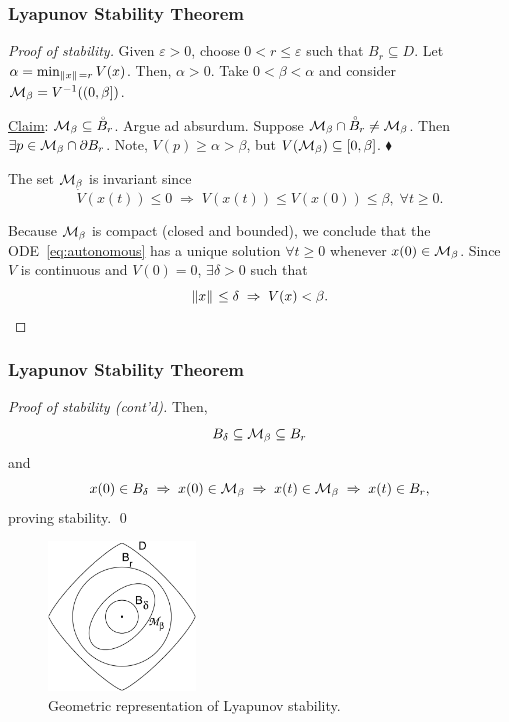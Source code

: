 \begin{frame}
    \frametitle{Lyapunov Stability Theorem}

    \begin{proof}[Proof of stability]
        Given $\varepsilon > 0$, choose $0 < r \leq \varepsilon$ such that $B_r
        \subseteq D$. Let $\alpha = \min_{\|{x}\|_{{}_{}}=r} V(x)$. Then, $\alpha >
        0$. Take $0 < \beta < \alpha$ and consider $\mathcal{M}_\beta = V^{-1}((0,
        \beta])$.

        \underline{Claim}: $\mathcal{M}_\beta \subseteq \accentset{\circ}{B}_r$.
        Argue ad absurdum. Suppose $\mathcal{M}_\beta \cap \accentset{\circ}{B}_r
        \neq \mathcal{M}_\beta$. Then $\exists p \in \mathcal{M}_\beta \cap \partial B_r$.
        Note, $V(p) \geq \alpha > \beta$, but $V(\mathcal{M}_\beta) \subseteq
        [0,\beta]$. \hfill $\blacklozenge$

        The set $\mathcal{M}_\beta$ is invariant since \[ \dot{V}(x(t)) \leq 0 \;
        \Rightarrow \; V(x(t)) \leq V(x(0)) \leq \beta, \; \forall t \geq 0. \]

        Because $\mathcal{M}_\beta$ is compact (closed and bounded), we conclude that
        the ODE~\eqref{eq:autonomous} has a unique solution $\forall t \geq 0$
        whenever $x(0) \in \mathcal{M}_\beta$. Since $V$ is continuous and $V(0) =
        0$, $\exists \delta > 0$ such that \[ \|{x}\|_{{}_{}} \leq \delta \;
        \Rightarrow \; V(x) < \beta. \]
    \end{proof}
\end{frame}

\begin{frame}
    \frametitle{Lyapunov Stability Theorem}

    \begin{proof}[Proof of stability (cont'd)]
        Then, \[ B_\delta \subseteq \mathcal{M}_\beta \subseteq B_r \] and 
        \[ x(0) \in B_\delta \; \Rightarrow \; x(0) \in \mathcal{M}_\beta \;
        \Rightarrow \; x(t) \in \mathcal{M}_\beta \; \Rightarrow \; x(t) \in B_r, \]
        proving stability. \hfill \qed
    \end{proof}

    \begin{figure}[bth]
        \centering
        \includegraphics[width=0.35\textwidth]{figures/lyap_geometry.eps} 
        \caption{\footnotesize Geometric representation of Lyapunov stability.}
    \end{figure}
\end{frame}

